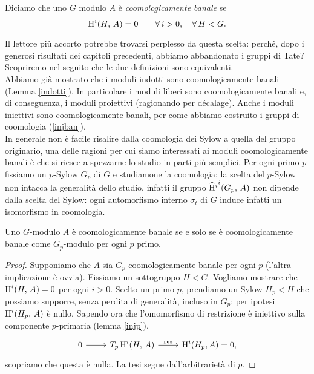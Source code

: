 \begin{definition}
	Diciamo che uno $ G $ modulo $ A $ è \emph{coomologicamente banale} se
	$$  \operatorname{H}^i(H, \, A) = 0 \qquad \forall \, i > 0, \quad  \forall \, H < G.  $$
\end{definition}

Il lettore più accorto potrebbe trovarsi perplesso da questa scelta: perché, dopo i generosi risultati dei capitoli precedenti, abbiamo abbandonato i gruppi di Tate? Scopriremo nel seguito che le due definizioni sono equivalenti. \\

Abbiamo già mostrato che i moduli indotti sono coomologicamente banali (Lemma \ref{indotti}). In particolare i moduli liberi sono coomologicamente banali e, di conseguenza, i moduli proiettivi (ragionando per décalage). Anche i moduli iniettivi sono coomologicamente banali, per come abbiamo costruito i gruppi di coomologia (\ref{injban}). \\

In generale non è facile risalire dalla coomologia dei Sylow a quella del gruppo originario, una delle ragioni per cui siamo interessati ai moduli coomologicamente banali è che si riesce a spezzarne lo studio in parti più semplici. Per ogni primo $ p $ fissiamo un $ p $-Sylow $ G_p $ di $ G $ e studiamone la coomologia; la scelta del $ p $-Sylow non intacca la generalità dello studio, infatti il gruppo $ \operatorname{\widehat{H}^\mathnormal{i}}^i(G_p, \, A) $ non dipende dalla scelta del Sylow: ogni automorfismo interno $ \sigma_t $ di $ G $ induce infatti un isomorfismo in coomologia. 

\begin{lemma}\label{banSylow}
	Uno $ G $-modulo $ A $ è coomologicamente banale se e solo se è coomologicamente banale come $ G_p $-modulo per ogni $ p $ primo.
\end{lemma}
\begin{proof}
	Supponiamo che $ A $ sia $ G_p $-coomologicamente banale per ogni $ p $ (l'altra implicazione è ovvia). Fissiamo un sottogruppo $ H < G $. Vogliamo mostrare che
	$  \operatorname{H}^i(H, \, A) = 0 $ per ogni $ i > 0 $. Scelto un primo $ p $, prendiamo un Sylow $ H_p < H $ che possiamo supporre, senza perdita di generalità, incluso in $ G_p $: per ipotesi $ \operatorname{H}^i(H_p, \, A) $ è nullo.
	Sapendo ora che l'omomorfismo di restrizione è iniettivo sulla componente $ p $-primaria (lemma \ref{injp}),
	$$ \begin{tikzcd}
	0 \rar & T_p\HH^i(H, \, A) \rar["\Res"] & \HH^i(H_p, A) = 0,
	\end{tikzcd}  $$
	scopriamo che questa è nulla. La tesi segue dall'arbitrarietà di $ p $.
\end{proof}


